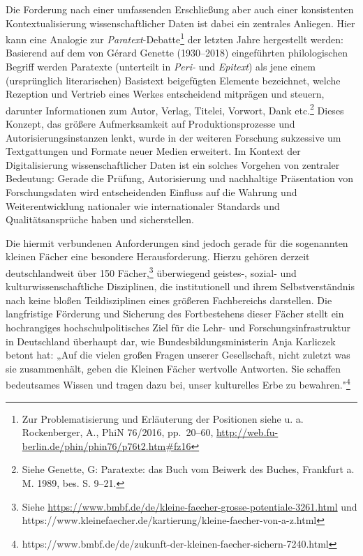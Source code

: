 Die Forderung nach einer umfassenden Erschließung aber auch einer
konsistenten Kontextualisierung wissenschaftlicher Daten ist dabei ein
zentrales Anliegen. Hier kann eine Analogie zur
\emph{Paratext}-Debatte\footnote{Zur Problematisierung und Erläuterung
  der Positionen siehe u. a. Rockenberger, A., PhiN 76/2016, pp.~20--60,
  \url{http://web.fu-berlin.de/phin/phin76/p76t2.htm\#fz16}} der letzten
Jahre hergestellt werden: Basierend auf dem von Gérard Genette
(1930--2018) eingeführten philologischen Begriff werden Paratexte
(unterteilt in \emph{Peri-} und \emph{Epitext}) als jene einem
(ursprünglich literarischen) Basistext beigefügten Elemente bezeichnet,
welche Rezeption und Vertrieb eines Werkes entscheidend mitprägen und
steuern, darunter Informationen zum Autor, Verlag, Titelei, Vorwort,
Dank etc.\footnote{Siehe Genette, G: Paratexte: das Buch vom Beiwerk des
  Buches, Frankfurt a. M. 1989, bes. S. 9--21.} Dieses Konzept, das
größere Aufmerksamkeit auf Produktionsprozesse und
Autorisierungsinstanzen lenkt, wurde in der weiteren Forschung
sukzessive um Textgattungen und Formate neuer Medien erweitert. Im
Kontext der Digitalisierung wissenschaftlicher Daten ist ein solches
Vorgehen von zentraler Bedeutung: Gerade die Prüfung, Autorisierung und
nachhaltige Präsentation von Forschungsdaten wird entscheidenden
Einfluss auf die Wahrung und Weiterentwicklung nationaler wie
internationaler Standards und Qualitätsansprüche haben und
sicherstellen.

Die hiermit verbundenen Anforderungen sind jedoch gerade für die
sogenannten kleinen Fächer eine besondere Herausforderung. Hierzu
gehören derzeit deutschlandweit über 150 Fächer,\footnote{Siehe
  \url{https://www.bmbf.de/de/kleine-faecher-grosse-potentiale-3261.html}
  und
  https://www.kleinefaecher.de/kartierung/kleine-faecher-von-a-z.html}
überwiegend geistes-, sozial- und kulturwissenschaftliche Disziplinen,
die institutionell und ihrem Selbstverständnis nach keine bloßen
Teildisziplinen eines größeren Fachbereichs darstellen. Die langfristige
Förderung und Sicherung des Fortbestehens dieser Fächer stellt ein
hochrangiges hochschulpolitisches Ziel für die Lehr- und
Forschungsinfrastruktur in Deutschland überhaupt dar, wie
Bundesbildungsministerin Anja Karliczek betont hat: „Auf die vielen
großen Fragen unserer Gesellschaft, nicht zuletzt was sie zusammenhält,
geben die Kleinen Fächer wertvolle Antworten. Sie schaffen bedeutsames
Wissen und tragen dazu bei, unser kulturelles Erbe zu
bewahren."\footnote{https://www.bmbf.de/de/zukunft-der-kleinen-faecher-sichern-7240.html}

